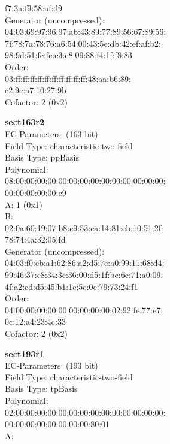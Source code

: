     f7:3a:f9:58:af:d9\\
Generator (uncompressed):\\
    04:03:69:97:96:97:ab:43:89:77:89:56:67:89:56:\\
    7f:78:7a:78:76:a6:54:00:43:5e:db:42:ef:af:b2:\\
    98:9d:51:fe:fc:e3:c8:09:88:f4:1f:f8:83\\
Order: \\
    03:ff:ff:ff:ff:ff:ff:ff:ff:ff:ff:48:aa:b6:89:\\
    c2:9c:a7:10:27:9b\\
Cofactor:  2 (0x2)\\
\item \textbf{ sect163r2 }\\
EC-Parameters: (163 bit)\\
Field Type: characteristic-two-field\\
Basis Type: ppBasis\\
Polynomial:\\
    08:00:00:00:00:00:00:00:00:00:00:00:00:00:00:\\
    00:00:00:00:00:c9\\
A:    1 (0x1)\\
B:   \\
    02:0a:60:19:07:b8:c9:53:ca:14:81:eb:10:51:2f:\\
    78:74:4a:32:05:fd\\
Generator (uncompressed):\\
    04:03:f0:eb:a1:62:86:a2:d5:7e:a0:99:11:68:d4:\\
    99:46:37:e8:34:3e:36:00:d5:1f:bc:6c:71:a0:09:\\
    4f:a2:cd:d5:45:b1:1c:5c:0c:79:73:24:f1\\
Order: \\
    04:00:00:00:00:00:00:00:00:00:02:92:fe:77:e7:\\
    0c:12:a4:23:4c:33\\
Cofactor:  2 (0x2)\\
\item \textbf{ sect193r1 }\\
EC-Parameters: (193 bit)\\
Field Type: characteristic-two-field\\
Basis Type: tpBasis\\
Polynomial:\\
    02:00:00:00:00:00:00:00:00:00:00:00:00:00:00:\\
    00:00:00:00:00:00:00:00:80:01\\
A:   \\
